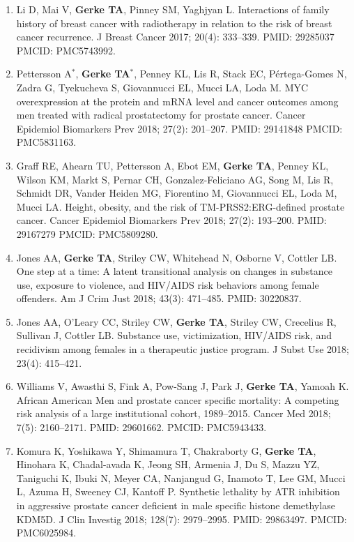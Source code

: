 \documentclass[11pt, a4paper]{article} %
\begin{document}
\begin{enumerate}[leftmargin=*]
\item{} Li D, Mai V, {\bf Gerke TA}, Pinney SM, Yaghjyan L. Interactions of family history of breast cancer with radiotherapy in relation to the risk of breast cancer recurrence. J Breast Cancer 2017; 20(4): 333--339. PMID: 29285037 PMCID: PMC5743992. 

\item{} Pettersson A$^*$, {\bf Gerke TA$^*$}, Penney KL, Lis R, Stack EC, P\'{e}rtega-Gomes N, Zadra G, Tyekucheva S, Giovannucci EL, Mucci LA, Loda M. MYC overexpression at the protein and mRNA level and cancer outcomes among men treated with radical prostatectomy for prostate cancer. Cancer Epidemiol Biomarkers Prev 2018; 27(2): 201--207. PMID: 29141848 PMCID: PMC5831163.

\item{} Graff RE, Ahearn TU, Pettersson A, Ebot EM, {\bf Gerke TA}, Penney KL, Wilson KM, Markt S, Pernar CH, Gonzalez-Feliciano AG, Song M, Lis R, Schmidt DR, Vander Heiden MG, Fiorentino M, Giovannucci EL, Loda M, Mucci LA. Height, obesity, and the risk of TM-PRSS2:ERG-defined prostate cancer. Cancer Epidemiol Biomarkers Prev 2018; 27(2): 193--200. PMID: 29167279 PMCID: PMC5809280.

\item{} Jones AA, {\bf Gerke TA}, Striley CW, Whitehead N, Osborne V, Cottler LB. One step at a time: A latent transitional analysis on changes in substance use, exposure to violence, and HIV/AIDS risk behaviors among female offenders. Am J Crim Just 2018; 43(3): 471--485. PMID: 30220837.

\item{} Jones AA, O'Leary CC, Striley CW, {\bf Gerke TA}, Striley CW, Crecelius R, Sullivan J, Cottler LB. Substance use, victimization, HIV/AIDS risk, and recidivism among females in a therapeutic justice program. J Subst Use 2018; 23(4): 415--421.

\item{} Williams V, Awasthi S, Fink A, Pow-Sang J, Park J, {\bf Gerke TA}, Yamoah K. African American Men and prostate cancer specific mortality: A competing risk analysis of a large institutional cohort, 1989--2015. Cancer Med 2018; 7(5): 2160--2171. PMID: 29601662. PMCID: PMC5943433.

\item{} Komura K, Yoshikawa Y, Shimamura T, Chakraborty G, {\bf Gerke TA}, Hinohara K, Chadal-avada K, Jeong SH,  Armenia J, Du S, Mazzu YZ, Taniguchi K, Ibuki N, Meyer CA, Nanjangud G, Inamoto T, Lee GM, Mucci L, Azuma H, Sweeney CJ, Kantoff P. Synthetic lethality by ATR inhibition in aggressive prostate cancer deficient in male specific histone demethylase KDM5D. J Clin Investig 2018; 128(7): 2979--2995. PMID: 29863497. PMCID: PMC6025984.


\end{enumerate}
\end{document}
